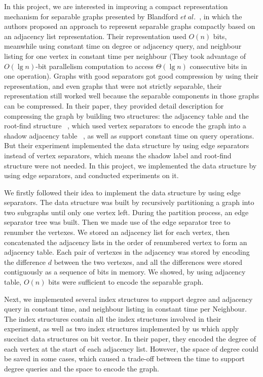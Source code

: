 \documentclass[12pt,glossary]{dalthesis}
\begin{document}
\bigskip

In this project, we are interested in improving a compact representation mechanism for separable graphs presented by Blandford $et \ al.$~\cite{compact-representation}, in which the authors proposed an approach to represent separable graphs compactly based on an adjacency list representation. Their representation used $O(n)$ bits, meanwhile using constant time on degree or adjacency query, and neighbour listing for one vertex in constant time per neighbour (They took advantage of $O(\lg n)$-bit parallelism computation to access $\Theta(\lg n)$ consecutive bits in one operation). Graphs with good separators got good compression by using their representation, and even graphs that were not strictly separable, their representation still worked well because the separable components in those graphs can be compressed. In their paper, they provided detail description for compressing the graph by building two structures: the adjacency table and the root-find structure ~\cite{compact-representation}, which used vertex separators to encode the graph into a shadow adjacency table ~\cite{compact-representation}, as well as support constant time on query operations. But their experiment implemented the data structure by using edge separators instead of vertex separators, which means the shadow label and root-find structure were not needed. In this project, we implemented the data structure by using edge separators, and conducted experiments on it.

\bigskip
\bigskip

We firstly followed their idea to implement the data structure by using edge separators. The data structure was built by recursively partitioning a graph into two subgraphs until only one vertex left. During the partition process, an edge separator tree was built. Then we made use of the edge separator tree to renumber the vertexes. We stored an adjacency list for each vertex, then concatenated the adjacency lists in the order of renumbered vertex to form an adjacency table. Each pair of vertexes in the adjacency was stored by encoding the difference $d$ between the two vertexes, and all the differences were stored contiguously as a sequence of bits in memory. We showed, by using adjacency table, $O(n)$ bits were sufficient to encode the separable graph. 

\bigskip
\bigskip

Next, we implemented several index structures to support degree and adjacency query in constant time, and neighbour listing in constant time per Neighbour. The index structures contain all the index structures involved in their experiment, as well as two index structures implemented by us which apply succinct data structures on bit vector. In their paper, they encoded the degree of each vertex at the start of each adjacency list. However, the space of degree could be saved in some cases, which caused a trade-off between the time to support degree queries and the space to encode the graph.
\end{document}
